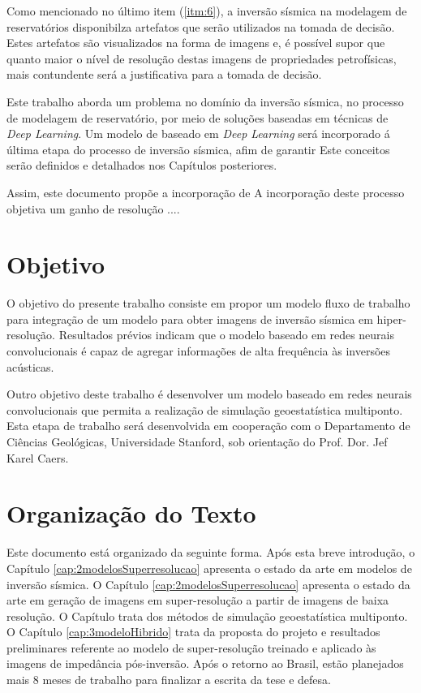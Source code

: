 Como mencionado no último item (\ref{itm:6}), a inversão sísmica na modelagem de reservatórios disponibilza
artefatos que serão utilizados na tomada de decisão. Estes artefatos são visualizados na forma de imagens
e, é possível supor que quanto maior o nível de resolução destas imagens de propriedades petrofísicas,
mais contundente será a justificativa para a tomada de decisão.

Este trabalho aborda um problema no domínio da inversão sísmica,
no processo de modelagem de reservatório, por meio de soluções baseadas em técnicas de \textit{Deep Learning}.
Um modelo de baseado em \textit{Deep Learning} será incorporado á última etapa do processo de inversão sísmica,
afim de garantir 
Este conceitos serão definidos e detalhados nos Capítulos posteriores.

Assim, este documento propõe a incorporação de
A incorporação deste processo objetiva um ganho de resolução ....


\section{Objetivo}

O objetivo do presente trabalho consiste em propor um modelo fluxo de trabalho
para integração de um modelo para obter imagens de inversão sísmica em hiper-resolução.
Resultados prévios indicam que o modelo baseado em redes neurais convolucionais é capaz
de agregar informações de alta frequência às inversões acústicas.

Outro objetivo deste trabalho é desenvolver um modelo baseado em redes neurais convolucionais que permita a
realização de simulação geoestatística multiponto. Esta etapa de trabalho será desenvolvida
em cooperação com o Departamento de Ciências Geológicas, Universidade Stanford, sob
orientação do Prof. Dor. Jef Karel Caers.


\section{Organização do Texto}

Este documento está organizado da seguinte forma. Após esta breve introdução, o
Capítulo \ref{cap:2modelosSuperresolucao} apresenta o estado da arte em modelos de
inversão sísmica. O Capítulo \ref{cap:2modelosSuperresolucao} apresenta o estado da arte 
em geração de imagens em super-resolução a partir de imagens de baixa resolução.
O Capítulo trata dos métodos de simulação geoestatística multiponto. O
Capítulo \ref{cap:3modeloHibrido} trata da proposta do projeto e resultados
preliminares referente ao modelo de super-resolução treinado e aplicado às imagens
de impedância pós-inversão. Após o retorno ao Brasil, estão planejados mais 8 meses
de trabalho para finalizar a escrita da tese e defesa.

